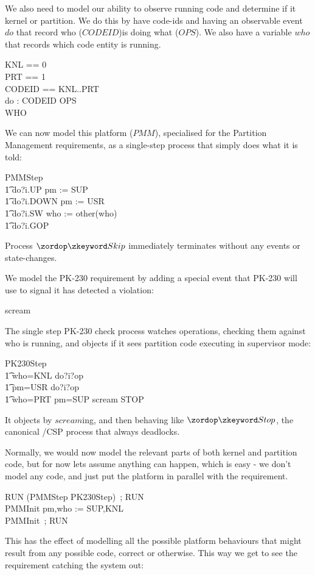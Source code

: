 We also need to model our ability to observe running code
and determine if it kernel or partition.
We do this by have code-ids and having an observable event $do$
that record who ($CODEID$)is doing what ($OPS$).
We also have a variable $who$ that records which code entity is running.
\begin{circus}
KNL == 0 \\
PRT == 1 \\
CODEID == KNL..PRT \\
\circchannel do : CODEID \times OPS \\
WHO 
\end{circus}

We can now model this platform ($PMM$),
specialised for the  Partition Management requirements,
as a single-step process that simply does what it is told:
\begin{circus}
PMMStep  \\
\t1 do?i.UP \then pm := SUP \\
\t1 \extchoice do?i.DOWN \then pm := USR \\
\t1 \extchoice do?i.SW \then who := other(who) \\
\t1 do?i.GOP \then \Skip
\end{circus}
Process $\Skip$ immediately terminates without any events or state-changes.

We model the PK-230 requirement by adding a special event that PK-230
will use to signal it has detected a violation:
\begin{circus}
\circchannel scream
\end{circus}
The single step PK-230 check process watches operations,
checking them against who is running, and objects if it sees
partition code executing in supervisor mode:
\begin{circus}
PK230Step  \\
\t1 who=KNL \circguard do?i?op \then \Skip \\
\t1 pm=USR \circguard do?i?op \then \Skip \\
\t1 who=PRT \land pm=SUP \circguard scream \then STOP
\end{circus}
It objects by $scream$ing, and then behaving like $\Stop$,
the canonical \Circus/CSP process that always deadlocks.

Normally, we would now model the relevant parts of both kernel and
partition code, but for now lets assume anything can happen,
which is easy - we don't model any code, and just put the platform
in parallel with the requirement.
\begin{circus}
RUN  (PMMStep \interleave PK230Step)~; RUN\\
PMMInit  pm,who := SUP,KNL \\
PMMInit~; RUN
\end{circus}
This has the effect of modelling
all the possible platform behaviours that might result from any
possible code, correct or otherwise.
This way we get to see the requirement catching the system out:


